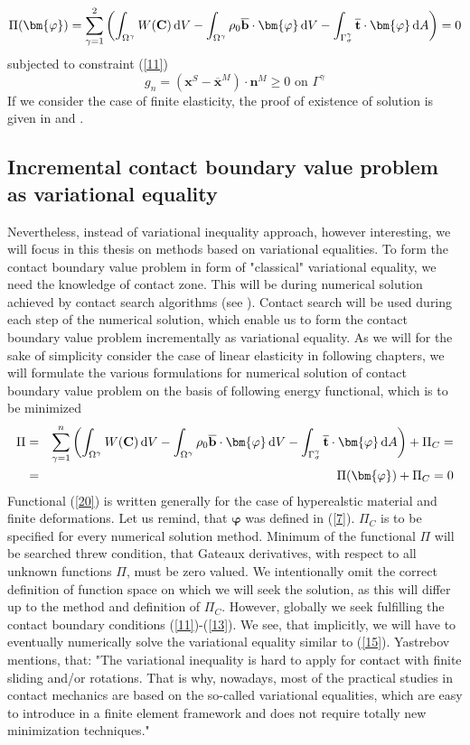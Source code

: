 \documentclass{article}
\newcommand{\beq}{\begin{equation}}
\newcommand{\eeq}{\end{equation}}
\newcommand{\bea}{\begin{eqnarray}}
\newcommand{\eea}{\end{eqnarray}}
\newcommand{\dd}{\,{\rm d}}
\begin{document}
\begin{equation}\label{19}
\Pi(\bm{\varphi}) = \sum^{2}_{\gamma = 1}\left(\int_{\Omega^{\gamma}} W(\mathbf{C})\dd V-\int_{\Omega^{\gamma}} \rho_{0}\overline{\mathbf{b}} \cdot \mathbf{\bm{\varphi}} \dd V-\int_{\Gamma_{\sigma}^{\gamma}} \overline{\mathbf{t}} \cdot \mathbf{\bm{\varphi}} \dd A\right)=0
\end{equation}
subjected to constraint (\ref{11})
\beq
g_{n}=\left(\mathbf{x}^{S}-\overline{\mathbf{x}}^{M}\right) \cdot \mathbf{n}^{M} \geq 0 \text{ on } \Gamma^{\gamma} 
\nonumber
\eeq
If we consider the case of finite elasticity, the proof of existence of solution is given in \cite{Ciarlet} and \cite{Curnier}.
\subsection{Incremental contact boundary value problem as variational equality}
Nevertheless, instead of variational inequality approach, however interesting, we will focus in this thesis on methods based on variational equalities. To form the contact boundary value problem in form of "classical" variational equality, we need the knowledge of contact zone. This will be during numerical solution achieved by contact search algorithms (see \cite[Chapter 9]{Wriggers}). Contact search will be used during each step of the numerical solution, which enable us to form the contact boundary value problem incrementally as variational equality. As we will for the sake of simplicity consider the case of linear elasticity in following chapters, we will formulate the various formulations for numerical solution of contact boundary value problem on the basis of following energy functional, which is to be minimized
\bea\label{20}
\Pi&=&\sum^{n}_{\gamma = 1}\left(\int_{\Omega^{\gamma}} W(\mathbf{C})\dd V-\int_{\Omega^{\gamma}} \rho_{0}\overline{\mathbf{b}} \cdot \mathbf{\bm{\varphi}} \dd V-\int_{\Gamma_{\sigma}^{\gamma}} \overline{\mathbf{t}} \cdot \mathbf{\bm{\varphi}} \dd A\right) + \Pi_{C}=
\nonumber
\\
&=&\Pi(\bm{\varphi})+ \Pi_{C} = 0
\eea
Functional (\ref{20}) is written generally for the case of hyperealstic material and finite deformations. Let us remind, that $ \mathbf{\bm{\varphi}} $ was defined in (\ref{7}). $ \Pi_{C} $ is to be specified for every numerical solution method. Minimum of the functional $ \Pi $ will be searched threw condition, that Gateaux derivatives, with respect to all unknown functions $ \Pi $, must be zero valued. We intentionally omit the correct definition of function space on which we will seek the solution, as this will differ up to the method and definition of $ \Pi_{C} $. However, globally we seek fulfilling the contact boundary conditions (\ref{11})-(\ref{13}). We see, that implicitly, we will have to eventually numerically solve the variational equality similar to (\ref{15}). Yastrebov \cite[Chapter 4, p.144]{Yastrebov} mentions, that: "The variational inequality is hard to apply for contact with finite sliding and/or rotations. That is why, nowadays, most of the practical studies in contact mechanics are based on the
so-called variational equalities, which are easy to introduce in a finite element
framework and does not require totally new minimization techniques."   
\newpage
\end{document}
